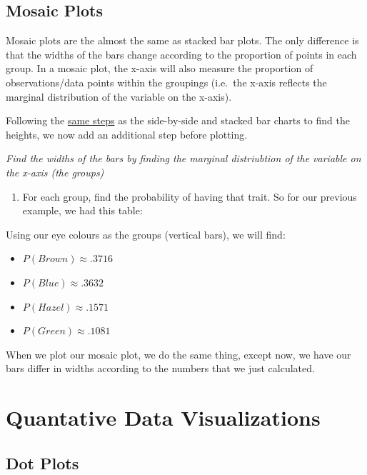 \documentclass[
]{book}
\providecommand{\tightlist}{%
  \setlength{\itemsep}{0pt}\setlength{\parskip}{0pt}}
\begin{document}
\hypertarget{mosaic-plots}{%
\section{Mosaic Plots}\label{mosaic-plots}}

Mosaic plots are the almost the same as stacked bar plots. The only
difference is that the widths of the bars change according to the
proportion of points in each group. In a mosaic plot, the x-axis will
also measure the proportion of observations/data points within the
groupings (i.e.~the x-axis reflects the marginal distribution of the
variable on the x-axis).

Following the \protect\hyperlink{stacked-bar-plots-and-side-by-side-bar-plots}{same
steps} as the
side-by-side and stacked bar charts to find the heights, we now add an
additional step before plotting.

\emph{Find the widths of the bars by finding the marginal distriubtion of the
variable on the x-axis (the groups)}

\begin{enumerate}
\def\labelenumi{\arabic{enumi}.}
\tightlist
\item
  For each group, find the probability of having that trait. So for
  our previous example, we had this table:
\end{enumerate}

Using our eye colours as the groups (vertical bars), we will find:

\begin{itemize}
\item
  \(P(Brown) \approx .3716\)
\item
  \(P(Blue) \approx .3632\)
\item
  \(P(Hazel) \approx .1571\)
\item
  \(P(Green) \approx .1081\)
\end{itemize}

When we plot our mosaic plot, we do the same thing, except now, we have
our bars differ in widths according to the numbers that we just
calculated.

\hypertarget{quantative-data-visualizations}{%
\chapter{Quantative Data Visualizations}\label{quantative-data-visualizations}}

\hypertarget{dot-plots}{%
\section{Dot Plots}\label{dot-plots}}
\end{document}
